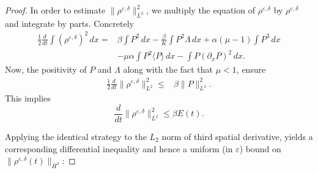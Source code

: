 \documentclass[12pt]{amsart}
\newcommand{\rhoed}{\rho^{\varepsilon,\delta}}
\newcommand{\D}{\,d}
\begin{document}
\begin{proof}
        In order to estimate  $\|\rho^{\varepsilon,\delta}\|_{L^2}^2$, we multiply the  equation of $\rho^{\varepsilon,\delta}$ by $\rho^{\varepsilon,\delta}$ and integrate by parts. Concretely
        \[
            \begin{split}
                \frac{1}{2}\frac{d}{dt}\int (\rho^{\varepsilon,\delta})^2\D x=&\beta\int  P^2\D x-\frac{\beta}{K}\int P^2 \Lambda \D x
                +\alpha(\mu-1)\int P^3\D x\\&-\mu\alpha\int P^2 \langle P \rangle\D x-\int P(\partial_x P)^2\D x.
            \end{split}
        \]
        Now, the positivity of  $P$ and $\Lambda$ along with the fact that $\mu<1$, ensure
        \[
            \begin{split}
                \frac{1}{2}\frac{d}{dt}\|\rhoed\|_{L^2}^2\leq&\beta\| P\|_{L^2}^2.
            \end{split}
        \]
        This implies
        \begin{equation*}
            \frac{d}{dt}\|\rho^{\varepsilon,\delta}\|_{L^2}^2\leq  \beta E(t).
        \end{equation*}

        Applying the identical strategy to the $L_2$ norm of third spatial derivative,
 yields a corresponding differential inequality and hence a uniform (in $\varepsilon$) bound on $\|\rho^{\varepsilon,\delta}(t)\|_{H^3}$:




\end{proof}
\end{document}
